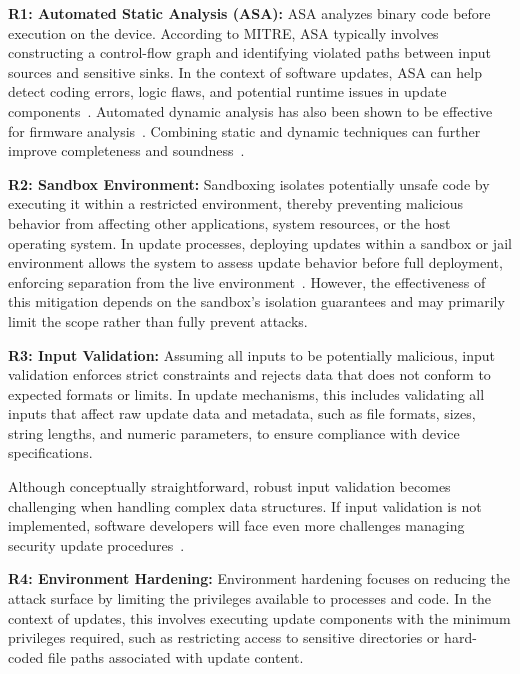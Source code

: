 \documentclass[fleqn,s1,names,tex]{neptune}
\begin{document}
 

\cvpt\textbf{R1: Automated Static Analysis (ASA):}
ASA analyzes binary code before execution on the device. 
According to MITRE, ASA typically involves constructing a control-flow graph and identifying violated paths between input sources and sensitive sinks. 
In the context of software updates, ASA can help detect coding errors, logic
flaws, and potential runtime issues in update components~\citep{4815346}. 
Automated dynamic analysis has also been shown to be effective for firmware
analysis~\citep{chen2016towards}. Combining static and dynamic techniques can
further improve completeness and soundness~\citep{294541}.



 

\cvpt\textbf{R2: Sandbox Environment:}
Sandboxing isolates potentially unsafe code by executing it within a restricted environment, thereby preventing malicious behavior from affecting other applications, system resources, or the host operating system. 
In update processes, deploying updates within a sandbox or jail environment
allows the system to assess update behavior before full deployment, enforcing
separation from the live environment~\citep{LIU2022102613}. However, the
effectiveness of this mitigation depends on the sandbox's isolation guarantees
and may primarily limit the scope rather than fully prevent attacks.













\cvpt\textbf{R3: Input Validation:} 
Assuming all inputs to be potentially malicious, input validation enforces strict constraints and rejects data that does not conform to expected formats or limits. 
In update mechanisms, this includes validating all inputs that affect raw update data and metadata, such as file formats, sizes, string lengths, and numeric parameters, to ensure compliance with device specifications.

Although conceptually straightforward, robust input validation becomes challenging when handling complex data structures. 
If input validation is not implemented, software developers will face even more
challenges managing security update procedures~\citep{koien2023call}. 





 

\cvpt\textbf{R4: Environment Hardening:} 
Environment hardening focuses on reducing the attack surface by limiting the privileges available to processes and code. In the context of updates, this involves executing update components with the minimum privileges required, such as restricting access to sensitive directories or hard-coded file paths associated with update content.
\end{document}
